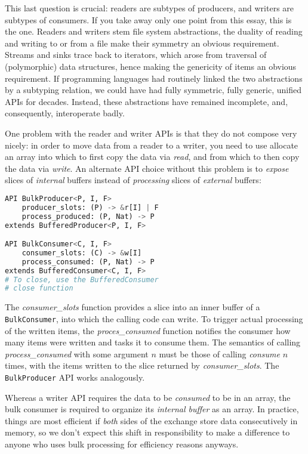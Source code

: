 \documentclass[sigplan,screen,10pt,anonymous,review]{acmart}
\begin{document}
This last question is crucial: readers are subtypes of producers, and writers are subtypes of consumers. If you take away only one point from this essay, this is the one. Readers and writers stem file system abstractions, the duality of reading and writing to or from a file make their symmetry an obvious requirement. Streams and sinks trace back to iterators, which arose from traversal of (polymorphic) data structures, hence making the genericity of items an obvious requirement. If programming languages had routinely linked the two abstractions by a subtyping relation, we could have had fully symmetric, fully generic, unified APIs for decades. Instead, these abstractions have remained incomplete, and, consequently, interoperate badly.

One problem with the reader and writer APIs is that they do not compose very nicely: in order to move data from a reader to a writer, you need to use allocate an array into which to first copy the data via \textit{read}, and from which to then copy the data via \textit{write}. An alternate API choice without this problem is to \textit{expose} slices of \textit{internal} buffers instead of \textit{processing} slices of \textit{external} buffers:

\begin{lstlisting}[language=Python]
API BulkProducer<P, I, F>
    producer_slots: (P) -> &r[I] | F
    process_produced: (P, Nat) -> P
extends BufferedProducer<P, I, F>

API BulkConsumer<C, I, F>
    consumer_slots: (C) -> &w[I]
    process_consumed: (P, Nat) -> P
extends BufferedConsumer<C, I, F>
# To close, use the BufferedConsumer
# close function
\end{lstlisting}

The \textit{consumer\_slots} function provides a slice into an inner buffer of a \texttt{BulkConsumer}, into which the calling code can write. To trigger actual processing of the written items, the \textit{proces\_consumed} function notifies the consumer how many items were written and tasks it to consume them. The semantics of calling \textit{process\_consumed} with some argument $n$ must be those of calling \textit{consume} $n$ times, with the items written to the slice returned by \textit{consumer\_slots}. The \texttt{BulkProducer} API works analogously.

Whereas a writer API requires the data to be \textit{consumed} to be in an array, the bulk consumer is required to organize its \textit{internal buffer} as an array. In practice, things are most efficient if \textit{both} sides of the exchange store data consecutively in memory, so we don't expect this shift in responsibility to make a difference to anyone who uses bulk processing for efficiency reasons anyways.
\end{document}
